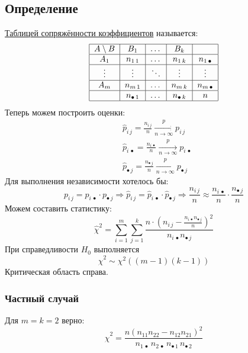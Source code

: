 \documentclass[12pt, a4paper]{article}
\begin{document}
\subsection*{Определение}
\underline{Таблицей сопряжённости коэффициентов} называется:
\[\begin{tabular}{|c|c|c|c|c|}
    \hline
    $A\setminus B$ & $B_1$ & $\dots$ & $B_k$ &  \\
    \hline
    $A_1$ & $n_{1\, 1}$ & $\dots$ & $n_{1\, k}$ & $n_{1\, \bullet}$\\
    \hline
    $\vdots$ & $\vdots$ & $\ddots$ & $\vdots$ & $\vdots$\\
    \hline
    $A_{m} $ & $n_{m\, 1}$ & $\dots$ & $n_{m\, k}$ & $n_{m\, \bullet}$\\
    \hline
     & $n_{\bullet\, 1}$ & $\dots$ & $n_{\bullet\, k}$ & $n$\\
     \hline
\end{tabular}\]
Теперь можем построить оценки:
\begin{equation*}
    \begin{aligned}
        &\hat p_{i\, j} = \frac{n_{i\, j}}{n} \xrightarrow[n \to \infty]{p} p_{i\, j}\\
        &\hat p_{i\, \bullet} = \frac{n_{i\, \bullet}}{n} \xrightarrow[n\to \infty]{p} p_{i\, \bullet}\\
        &\hat p_{\bullet\, j} = \frac{n_{\bullet\, j}}{n} \xrightarrow[n\to\infty]{p} p_{\bullet\, j}
    \end{aligned}
\end{equation*}
Для выполнения независимости хотелось бы:
\[p_{i\, j} = p_{i\, \bullet} \cdot p_{\bullet\, j} \Rightarrow \hat p_{i\, j} = \hat p_{i\, \bullet} \cdot \hat p_{\bullet\, j} \Rightarrow \frac{n_{i\, j}}{n} \approx \frac{n_{i\, \bullet}}{n} \cdot \frac{n_{\bullet\, j}}{n}\]
Можем составить статистику:
\[\hat \chi^2 = \sum_{i = 1}^{m} \sum_{j = 1}^{k} \frac{n \cdot {\left(n_{i\, j} - \frac{n_{i\, \bullet} n_{\bullet\, j}}{n}\right)}^2}{n_{i\, \bullet} n_{\bullet\, j}}\]
При справедливости $H_0$ выполняется
\[\hat \chi^2 \sim \chi^2\left( (m - 1)(k - 1) \right)\]
Критическая область справа.
\subsubsection*{Частный случай}
Для $m = k = 2$ верно:
\[\hat \chi^2 = \frac{n {(n_{11} n_{22} - n_{12} n_{21})}^2}{ n_{1\, \bullet}\, n_{2\, \bullet}\, n_{\bullet\, 1}\, n _{\bullet\, 2} }\]
\end{document}
